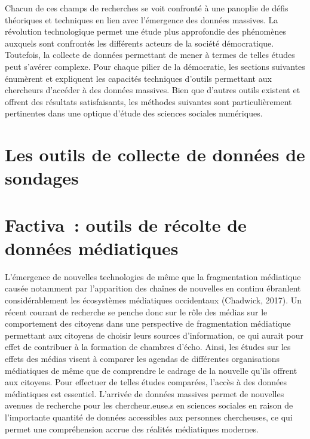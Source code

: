 \documentclass[
  letterpaper,
]{scrbook}
\begin{document}
Chacun de ces champs de recherches se voit confronté à une panoplie de
défis théoriques et techniques en lien avec l'émergence des données
massives. La révolution technologique permet une étude plus approfondie
des phénomènes auxquels sont confrontés les différents acteurs de la
société démocratique. Toutefois, la collecte de données permettant de
mener à termes de telles études peut s'avérer complexe. Pour chaque
pilier de la démocratie, les sections suivantes énumèrent et expliquent
les capacités techniques d'outils permettant aux chercheurs d'accéder à
des données massives. Bien que d'autres outils existent et offrent des
résultats satisfaisants, les méthodes suivantes sont particulièrement
pertinentes dans une optique d'étude des sciences sociales numériques.

\hypertarget{les-outils-de-collecte-de-donnuxe9es-de-sondages}{%
\section{Les outils de collecte de données de
sondages}\label{les-outils-de-collecte-de-donnuxe9es-de-sondages}}

\hypertarget{factiva-outils-de-ruxe9colte-de-donnuxe9es-muxe9diatiques}{%
\section{\texorpdfstring{\textbf{Factiva~: outils de récolte de données
médiatiques}}{Factiva~: outils de récolte de données médiatiques}}\label{factiva-outils-de-ruxe9colte-de-donnuxe9es-muxe9diatiques}}

L'émergence de nouvelles technologies de même que la fragmentation
médiatique causée notamment par l'apparition des chaînes de nouvelles en
continu ébranlent considérablement les écosystèmes médiatiques
occidentaux (Chadwick, 2017). Un récent courant de recherche se penche
donc sur le rôle des médias sur le comportement des citoyens dans une
perspective de fragmentation médiatique permettant aux citoyens de
choisir leurs sources d'information, ce qui aurait pour effet de
contribuer à la formation de chambres d'écho. Ainsi, les études sur les
effets des médias visent à comparer les agendas de différentes
organisations médiatiques de même que de comprendre le cadrage de la
nouvelle qu'ils offrent aux citoyens. Pour effectuer de telles études
comparées, l'accès à des données médiatiques est essentiel. L'arrivée de
données massives permet de nouvelles avenues de recherche pour les
chercheur.euse.s en sciences sociales en raison de l'importante quantité
de données accessibles aux personnes chercheuses, ce qui permet une
compréhension accrue des réalités médiatiques modernes.
\end{document}
